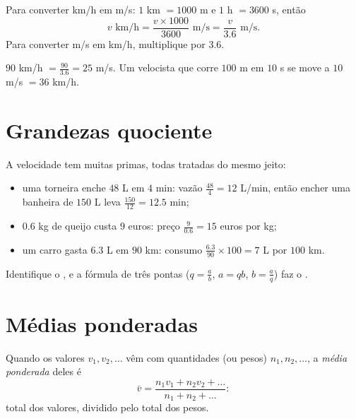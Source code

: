 \begin{method}\label{met:g8:speed:convert}
Para converter km/h em m/s: $1$ km $= 1000$ m e $1$ h $= 3600$ s,
então
\[
v \text{ km/h} = \frac{v \times 1000}{3600} \text{ m/s}
= \frac{v}{3.6} \text{ m/s}.
\]
Para converter m/s em km/h, multiplique por $3.6$.
\end{method}

\begin{example}\label{ex:g8:speed:convert}
$90$ km/h $= \frac{90}{3.6} = 25$ m/s. Um velocista que corre $100$ m
em $10$ s se move a $10$ m/s $= 36$ km/h.
\end{example}

\section{Grandezas quociente}

\begin{example}\label{ex:g8:speed:quotients}
A velocidade tem muitas primas, todas tratadas do mesmo jeito:
\begin{itemize}
  \item uma torneira enche $48$ L em $4$ min: vazão
        $\frac{48}{4} = 12$ L/min, então encher uma banheira de
        $150$ L leva $\frac{150}{12} = 12.5$ min;
  \item $0.6$ kg de queijo custa $9$ euros: preço
        $\frac{9}{0.6} = 15$ euros por kg;
  \item um carro gasta $6.3$ L em $90$ km: consumo
        $\frac{6.3}{90} \times 100 = 7$ L por $100$ km.
\end{itemize}
Identifique o , e a fórmula de três pontas
($q = \frac ab$, $a = qb$, $b = \frac aq$) faz o .
\end{example}

\section{Médias ponderadas}

\begin{definition}\label{def:g8:speed:average}
Quando os valores $v_1, v_2, \dots$ vêm com quantidades (ou pesos)
$n_1, n_2, \dots$, a \emph{média ponderada}
deles é
\[
\bar v = \frac{n_1 v_1 + n_2 v_2 + \dots}{n_1 + n_2 + \dots} :
\]
total dos valores, dividido pelo total dos pesos.
\end{definition}

